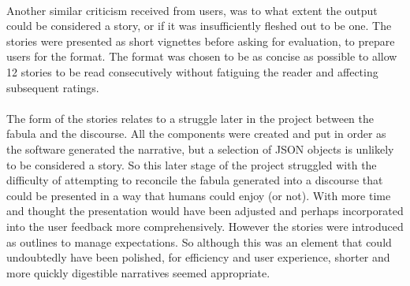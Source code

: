 \documentclass[letterpaper]{article}
\begin{document}
\\Another similar criticism received from users, was to what extent the output could be considered a story, or if it was insufficiently fleshed out to be one. The stories were presented as short vignettes before asking for evaluation, to prepare users for the format. The format was chosen to be as concise as possible to allow 12 stories to be read consecutively without fatiguing the reader and affecting subsequent ratings.\\
\\The form of the stories relates to a struggle later in the project between the fabula and the discourse. All the components were created and put in order as the software generated the narrative, but a selection of JSON objects is unlikely to be considered a story. So this later stage of the project struggled with the difficulty of attempting to reconcile the fabula generated into a discourse that could be presented in a way that humans could enjoy (or not). With more time and thought the presentation would have been adjusted and perhaps incorporated into the user feedback more comprehensively. However the stories were introduced as outlines to manage expectations. So although this was an element that could undoubtedly have been polished, for efficiency and user experience, shorter and more quickly digestible narratives seemed appropriate.

\end{document}
